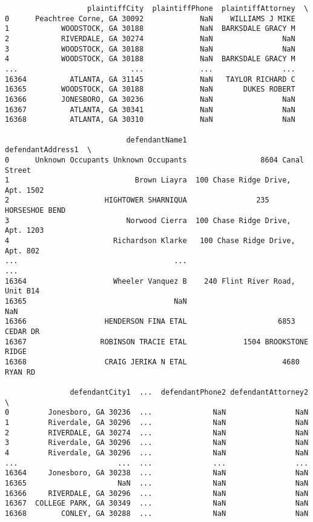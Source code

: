 \documentclass[11pt]{article}
\begin{document}
\begin{verbatim}
                   plaintiffCity  plaintiffPhone  plaintiffAttorney  \
0      Peachtree Corne, GA 30092             NaN    WILLIAMS J MIKE   
1            WOODSTOCK, GA 30188             NaN  BARKSDALE GRACY M   
2            RIVERDALE, GA 30274             NaN                NaN   
3            WOODSTOCK, GA 30188             NaN                NaN   
4            WOODSTOCK, GA 30188             NaN  BARKSDALE GRACY M   
...                          ...             ...                ...   
16364          ATLANTA, GA 31145             NaN   TAYLOR RICHARD C   
16365        WOODSTOCK, GA 30188             NaN       DUKES ROBERT   
16366        JONESBORO, GA 30236             NaN                NaN   
16367          ATLANTA, GA 30341             NaN                NaN   
16368          ATLANTA, GA 30310             NaN                NaN   

                            defendantName1                 defendantAddress1  \
0      Unknown Occupants Unknown Occupants                 8604 Canal Street   
1                             Brown Liayra  100 Chase Ridge Drive, Apt. 1502   
2                      HIGHTOWER SHARNIQUA                235 HORSESHOE BEND   
3                           Norwood Cierra  100 Chase Ridge Drive, Apt. 1203   
4                        Richardson Klarke   100 Chase Ridge Drive, Apt. 802   
...                                    ...                               ...   
16364                    Wheeler Vanquez B    240 Flint River Road, Unit B14   
16365                                  NaN                               NaN   
16366                  HENDERSON FINA ETAL                     6853 CEDAR DR   
16367                 ROBINSON TRACIE ETAL             1504 BROOKSTONE RIDGE   
16368                  CRAIG JERIKA N ETAL                      4680 RYAN RD   

               defendantCity1  ...  defendantPhone2 defendantAttorney2  \
0         Jonesboro, GA 30236  ...              NaN                NaN   
1         Riverdale, GA 30296  ...              NaN                NaN   
2         RIVERDALE, GA 30274  ...              NaN                NaN   
3         Riverdale, GA 30296  ...              NaN                NaN   
4         Riverdale, GA 30296  ...              NaN                NaN   
...                       ...  ...              ...                ...   
16364     Jonesboro, GA 30238  ...              NaN                NaN   
16365                     NaN  ...              NaN                NaN   
16366     RIVERDALE, GA 30296  ...              NaN                NaN   
16367  COLLEGE PARK, GA 30349  ...              NaN                NaN   
16368        CONLEY, GA 30288  ...              NaN                NaN   


\end{verbatim}
\end{document}
